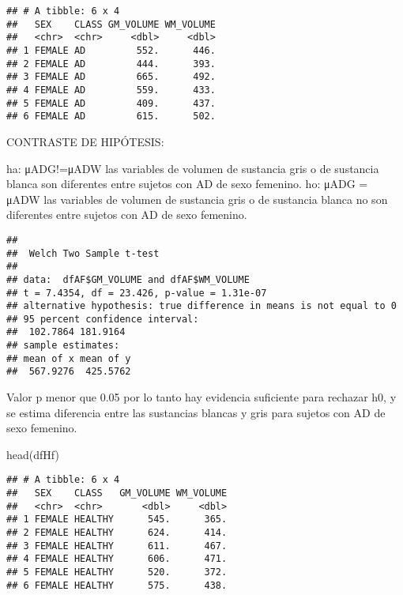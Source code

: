 \documentclass[
]{article}
\newenvironment{Shaded}{\begin{snugshade}}{\end{snugshade}}
\newcommand{\AttributeTok}[1]{\textcolor[rgb]{0.77,0.63,0.00}{#1}}
\newcommand{\FunctionTok}[1]{\textcolor[rgb]{0.00,0.00,0.00}{#1}}
\newcommand{\NormalTok}[1]{#1}
\newcommand{\SpecialCharTok}[1]{\textcolor[rgb]{0.00,0.00,0.00}{#1}}
\newcommand{\StringTok}[1]{\textcolor[rgb]{0.31,0.60,0.02}{#1}}
\begin{document}
\begin{verbatim}
## # A tibble: 6 x 4
##   SEX    CLASS GM_VOLUME WM_VOLUME
##   <chr>  <chr>     <dbl>     <dbl>
## 1 FEMALE AD         552.      446.
## 2 FEMALE AD         444.      393.
## 3 FEMALE AD         665.      492.
## 4 FEMALE AD         559.      433.
## 5 FEMALE AD         409.      437.
## 6 FEMALE AD         615.      502.
\end{verbatim}

CONTRASTE DE HIPÓTESIS:

ha: μADG!=μADW las variables de volumen de sustancia gris o de sustancia
blanca son diferentes entre sujetos con AD de sexo femenino. ho: μADG =
μADW las variables de volumen de sustancia gris o de sustancia blanca no
son diferentes entre sujetos con AD de sexo femenino.

\begin{Shaded}
\end{Shaded}

\begin{verbatim}
## 
##  Welch Two Sample t-test
## 
## data:  dfAF$GM_VOLUME and dfAF$WM_VOLUME
## t = 7.4354, df = 23.426, p-value = 1.31e-07
## alternative hypothesis: true difference in means is not equal to 0
## 95 percent confidence interval:
##  102.7864 181.9164
## sample estimates:
## mean of x mean of y 
##  567.9276  425.5762
\end{verbatim}

Valor p menor que 0.05 por lo tanto hay evidencia suficiente para
rechazar h0, y se estima diferencia entre las sustancias blancas y gris
para sujetos con AD de sexo femenino.

\begin{Shaded}
\begin{Highlighting}[]
\FunctionTok{head}\NormalTok{(dfHf)}
\end{Highlighting}
\end{Shaded}

\begin{verbatim}
## # A tibble: 6 x 4
##   SEX    CLASS   GM_VOLUME WM_VOLUME
##   <chr>  <chr>       <dbl>     <dbl>
## 1 FEMALE HEALTHY      545.      365.
## 2 FEMALE HEALTHY      624.      414.
## 3 FEMALE HEALTHY      611.      467.
## 4 FEMALE HEALTHY      606.      471.
## 5 FEMALE HEALTHY      520.      372.
## 6 FEMALE HEALTHY      575.      438.
\end{verbatim}
\end{document}

